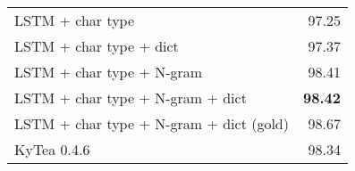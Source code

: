 \documentclass[11pt,letterpaper]{article}
\begin{document}
\begin{table}[t]
\begin{center}
\begin{tabular}{p{64mm}| r}
      LSTM + char type  & 97.25 \\    
      LSTM + char type + dict & 97.37 \\                                                                                                                             
      LSTM + char type + N-gram & 98.41\\ 
      LSTM + char type + N-gram + dict&{\bf 98.42} \\ 
      LSTM + char type + N-gram + dict (gold)& 98.67 \\  \hline
      KyTea 0.4.6 & 98.34 \\                                                                                                                                                                                                                                                                                                                   
    \bottomrule                                                                                                                                               
    \end{tabular}                                                                                                                                                                                                                                                                                                           
    \end{center}                                                                                                                                                                                                                                                                                                            
 \end{table} 
 
\end{document}
